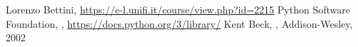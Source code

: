 \documentclass[12pt]{article}
\begin{document}
\begin{thebibliography}{10}

Lorenzo Bettini,
\newblock \url{https://e-l.unifi.it/course/view.php?id=2215}
%
Python Software Foundation,
,
\newblock \url{https://docs.python.org/3/library/}
%
Kent Beck,
,
\newblock Addison-Wesley, 2002
%
%
%
%
%
%
%
%
%
%
%
%
%
%
%
%
\end{thebibliography}
\end{document}
